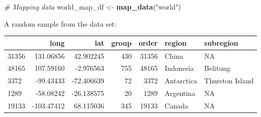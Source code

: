 \documentclass[]{book}
\newenvironment{Shaded}{\begin{snugshade}}{\end{snugshade}}
\newcommand{\KeywordTok}[1]{\textcolor[rgb]{0.13,0.29,0.53}{\textbf{#1}}}
\newcommand{\StringTok}[1]{\textcolor[rgb]{0.31,0.60,0.02}{#1}}
\newcommand{\CommentTok}[1]{\textcolor[rgb]{0.56,0.35,0.01}{\textit{#1}}}
\newcommand{\NormalTok}[1]{#1}
\theoremstyle{definition}
\theoremstyle{definition}
\theoremstyle{definition}
\theoremstyle{remark}
\begin{document}
\begin{Shaded}
\begin{Highlighting}[]
\CommentTok{# Mapping data}
\NormalTok{world_map_df <-}\StringTok{ }\KeywordTok{map_data}\NormalTok{(}\StringTok{"world"}\NormalTok{)}
\end{Highlighting}
\end{Shaded}

A random sample from the data set:

\begin{tabular}{l|r|r|r|r|l|l}
\hline
  & long & lat & group & order & region & subregion\\
\hline
31356 & 131.06856 & 42.902245 & 430 & 31356 & China & NA\\
\hline
48165 & 107.59160 & -2.976563 & 755 & 48165 & Indonesia & Belitung\\
\hline
3372 & -99.43433 & -72.406639 & 72 & 3372 & Antarctica & Thurston Island\\
\hline
1289 & -58.08242 & -26.138575 & 20 & 1289 & Argentina & NA\\
\hline
19133 & -103.47412 & 68.115036 & 345 & 19133 & Canada & NA\\
\hline
\end{tabular}
\end{document}
